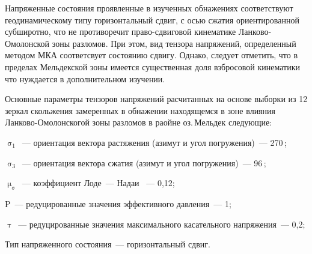 
\clearpage
Напряженные состояния проявленные в изученных обнажениях соответствуют
геодинамическому типу горизонтальный сдвиг, с осью сжатия ориентированной
субширотно, что не противоречит право-сдвиговой кинематике Ланково-Омолонской
зоны разломов. При этом, вид тензора напряжений, определенный методом МКА
соответсвует состоянию сдвигу. Однако, следует отметить, что в пределах
Мельдекской зоны имеется существенная доля взбросовой кинематики что нуждается
в дополнительном изучении.




Основные параметры тензоров напряжений расчитанных на основе выборки из 12 зеркал скольжения замеренных в обнажении находящемся в зоне влияния Ланково-Омолонскогой зоны разломов в раойне оз.\,Мельдек следующие:

\begin{description}[noitemsep]\vspace{-10pt}
\item $\upsigma_1$~--- ориентация вектора растяжения (азимут и угол погружения)~--- 270\dg\,;
\item $\upsigma_3$~--- ориентация вектора сжатия (азимут и угол погружения)~--- 96\dg\,;
\item $\upmu_\upsigma$~--- коэффициент Лоде~--- Надаи ~--- 0,12;
\item P~--- редуцированные значения эффективного давления~--- 1;
\item $\uptau$~--- редуцированные значения максимального касательного напряжения~--- 0,2;
\item Тип напряженного состояния~--- горизонтальный сдвиг.
\end{description}



%


